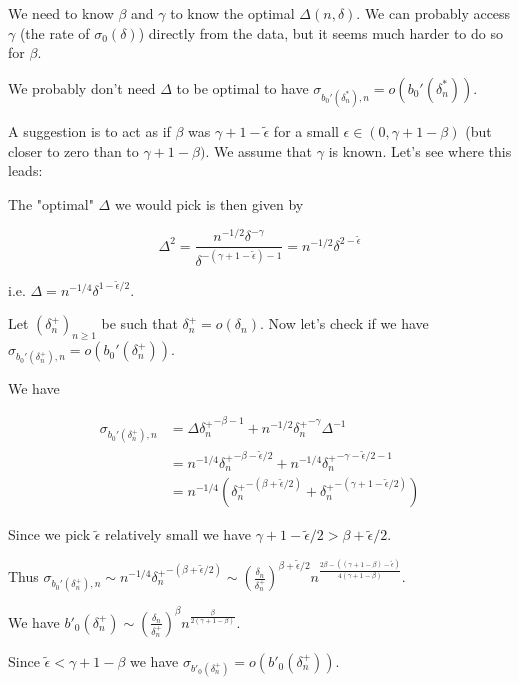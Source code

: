 \documentclass[a4paper]{article}
\begin{document}
We need to know $\beta$ and $\gamma$ to know the optimal $\Delta(n, \delta)$.
We can probably access $\gamma$ (the rate of $\sigma_0(\delta)$) directly from the data, but it seems much harder to do so for $\beta$.

We probably don't need $\Delta$ to be optimal to have $\sigma_{b_0'(\delta^*_n),n} = o(b_0'(\delta^*_n))$.

A suggestion is to act as if $\beta$ was $\gamma + 1- \tilde{\epsilon}$ for a small $\epsilon \in (0, \gamma + 1 - \beta)$ (but closer to zero than to $\gamma + 1 - \beta)$. We assume that $\gamma$ is known. Let's see where this leads:

The "optimal" $\Delta$ we would pick is then given by

$$\Delta^2 = \frac{n^{-1/2} \delta^{-\gamma}}{\delta^{-(\gamma + 1 - \tilde{\epsilon}) - 1}} = n^{-1/2} \delta^{2 - \tilde{\epsilon}}$$

i.e. $\Delta = n^{-1/4} \delta^{1 - \tilde{\epsilon}/2}$.

Let $(\delta_n^+)_{n \geq 1}$ be such that $\delta_n^+ = o(\delta_n)$. Now let's check if we have $\sigma_{b_0'(\delta^+_n),n} = o(b_0'(\delta^+_n))$.

We have

\begin{align*}
\sigma_{b_0'(\delta^+_n),n} &= \Delta {\delta^+_n}^{-\beta - 1} + n^{-1/2} {\delta^+_n}^{-\gamma} \Delta^{-1}\\
&=n^{-1/4} {\delta^+_n}^{-\beta - \tilde{\epsilon}/2} + n^{-1/4} {\delta^+_n}^{-\gamma - \tilde{\epsilon} / 2 - 1} \\
&= n^{-1/4} \left({\delta^+_n}^{-(\beta + \tilde{\epsilon} / 2)} + {\delta^+_n}^{-(\gamma + 1 - \tilde{\epsilon} / 2)} \right)
\end{align*}

Since we pick $\tilde{\epsilon}$ relatively small we have $\gamma + 1 - \tilde{\epsilon} / 2 >  \beta + \tilde{\epsilon} / 2$.

Thus $\sigma_{b_0'(\delta^+_n),n} \sim n^{-1/4} {\delta^+_n}^{-(\beta + \tilde{\epsilon} / 2)} \sim \left(\frac{\delta_n}{\delta_n^+}\right)^{\beta + \tilde{\epsilon}/2} n^\frac{2 \beta - ((\gamma + 1 - \beta) - \tilde{\epsilon})}{4(\gamma + 1 - \beta)}$.

We have $b'_0(\delta^+_n) \sim  \left(\frac{\delta_n}{\delta_n^+}\right)^{\beta} n^\frac{\beta}{2(\gamma + 1 - \beta)}$.

Since $\tilde{\epsilon} < \gamma + 1 - \beta$ we have $\sigma_{b'_0(\delta^+_n)} = o(b'_0(\delta^+_n))$.
\end{document}

